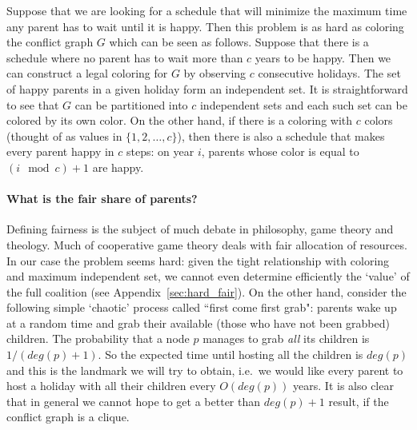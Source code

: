 \documentclass[11pt]{article}
\begin{document}
Suppose that we are looking for a schedule that will minimize the
maximum time any parent has to wait until it is happy. Then this
problem is as hard as coloring the conflict graph $G$ which can be
seen as follows. Suppose that there is a schedule where no parent has
to wait more than $c$ years to be happy. Then we can construct a legal
coloring for $G$ by observing $c$ consecutive holidays. The set of
happy parents in a given holiday form an independent set. It is
straightforward to see that $G$ can be partitioned into $c$
independent sets and each such set can be colored by its own color. On
the other hand, if there is a coloring with $c$ colors (thought of as
values in $\{1, 2, \ldots, c\}$), then there is also a schedule that
makes every parent happy in $c$ steps: on year $i$, parents whose color
is equal to $(i \mod c)+1$ are happy.

\paragraph{What is the fair share of parents?} Defining fairness is the subject of much debate in philosophy, game theory and theology. Much of cooperative game theory deals with fair allocation of resources. In our case the problem seems hard: given the tight relationship with coloring and maximum independent set, we cannot even determine efficiently the `value' of the full coalition (see Appendix~\ref{sec:hard_fair}). On the other hand, consider the following simple `chaotic' process called ``first come first grab": parents wake up at a random time and grab their available (those who have not been grabbed) children. The probability that a node $p$ manages to grab {\em all} its children is $1/(deg(p)+1)$. So the expected time until hosting all the children is $deg(p)$ and this is the landmark we will try to obtain, i.e.\ we would like every parent to host a holiday with all their children every $O(deg(p))$ years. It is also clear that in general we cannot hope to get a better than $deg(p)+1$ result, if the conflict graph is a clique.
\end{document}
